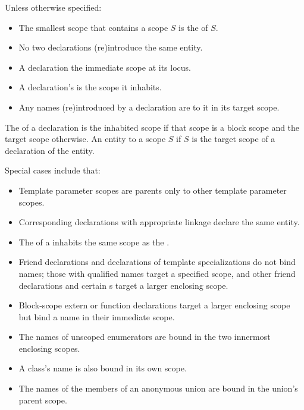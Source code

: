 \pnum
Unless otherwise specified:
\begin{itemize}
\item
The smallest scope that contains a scope $S$ is
the  of $S$.
\item
No two declarations (re)introduce the same entity.
\item
A declaration 
the immediate scope at its locus.
\item
A declaration's  is the scope it inhabits.
\item
Any names (re)introduced by a declaration are  to it
in its target scope.
\end{itemize}
The  of a declaration is
the inhabited scope if that scope is a block scope and
the target scope otherwise.
An entity  to a scope $S$
if $S$ is the target scope of a declaration of the entity.
\begin{note}
Special cases include that:
\begin{itemize}
\item
Template parameter scopes are parents
only to other template parameter scopes.
\item
Corresponding declarations with appropriate linkage
declare the same entity.
\item
The  of a 
inhabits the same scope as the .
\item
Friend declarations and
declarations of template specializations do not bind names;
those with qualified names target a specified scope, and
other friend declarations and
certain s
target a larger enclosing scope.
\item
Block-scope extern or function declarations target a larger enclosing scope
but bind a name in their immediate scope.
\item
The names of unscoped enumerators are bound
in the two innermost enclosing scopes.
\item
A class's name is also bound in its own scope.
\item
The names of the members of an anonymous union are bound in
the union's parent scope.
\end{itemize}
\end{note}

